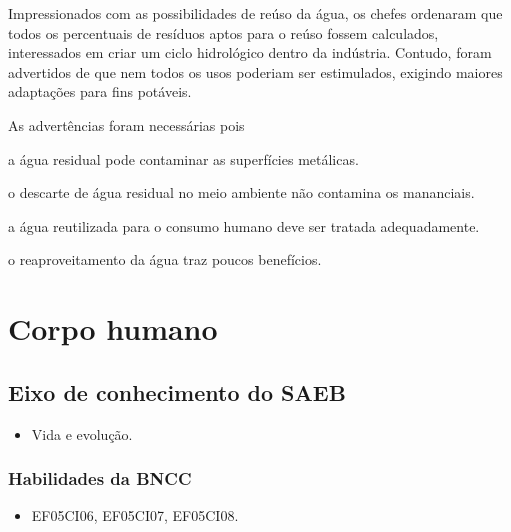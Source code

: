 Impressionados com as possibilidades de reúso da água, os chefes
ordenaram que todos os percentuais de resíduos
aptos para o reúso fossem calculados, interessados em criar um ciclo hidrológico dentro da
indústria. Contudo, foram advertidos de que nem todos os usos poderiam
ser estimulados, exigindo maiores adaptações para fins potáveis.

As advertências foram necessárias pois

\begin{escolha}
\item a água residual pode contaminar as superfícies metálicas.

\item o descarte de água residual no meio ambiente não contamina os mananciais.

\item a água reutilizada para o consumo humano deve ser tratada adequadamente.

\item o reaproveitamento da água traz poucos benefícios.
\end{escolha}

\chapter{Corpo humano}

\section*{Eixo de conhecimento do SAEB}
\begin{itemize}
	\item Vida e evolução.
\end{itemize}

\subsection{Habilidades da BNCC}

\begin{itemize}
\item EF05CI06, EF05CI07, EF05CI08.
\end{itemize}

